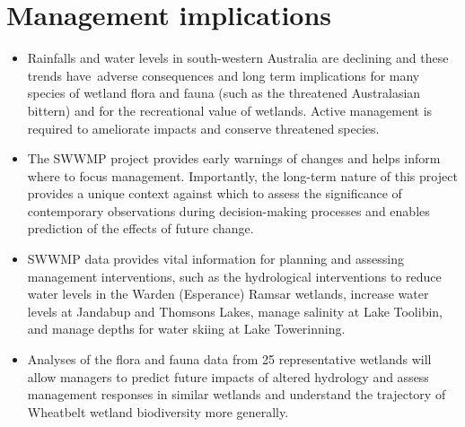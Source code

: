 \documentclass[version=last,
    paper=a4, %
    10pt, %
    usenames,
    dvipsnames,
    oneside, %
    headings=openany, %
    DIV=15 %
]{scrbook}
\begin{document}
\section*{Management implications}
\begin{itemize}
\itemsep1pt\parskip0pt
\item
  Rainfalls and water levels in south-western Australia are declining
  and these trends have~adverse consequences and long term implications
  for many species of wetland flora and fauna (such as the threatened
  Australasian bittern) and for the recreational value of wetlands.
  Active management is required to ameliorate impacts and conserve
  threatened species.
\item
  The SWWMP project provides early warnings of changes and helps inform
  where to focus management. Importantly, the long-term nature of this
  project provides a unique context against which to assess the
  significance of contemporary observations during decision-making
  processes and enables prediction of the effects of future change.
\item
  SWWMP data provides vital information for planning and assessing
  management interventions, such as the hydrological interventions to
  reduce water levels in the Warden (Esperance) Ramsar wetlands,
  increase water levels at Jandabup and Thomsons Lakes, manage salinity
  at Lake Toolibin, and manage depths for water skiing at Lake
  Towerinning.
\item
  Analyses of the flora and fauna data from 25 representative wetlands
  will allow managers to predict future impacts of altered hydrology and
  assess management responses in similar wetlands and understand the
  trajectory of Wheatbelt wetland biodiversity more generally.
\end{itemize}
\end{document}
